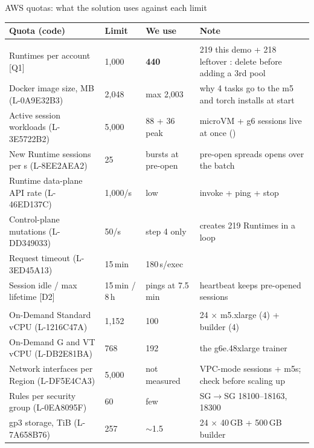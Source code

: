 \begin{frame}{AWS quotas: what the solution uses against each limit}
\tiny\setlength{\tabcolsep}{3pt}
\begin{tabularx}{\textwidth}{@{}P{0.36\textwidth}P{0.12\textwidth}P{0.13\textwidth}Y@{}}
\toprule
\textbf{Quota (code)} & \textbf{Limit} & \textbf{We use} & \textbf{Note}\\
\midrule
{}\\
Runtimes per account [Q1] & 1{,}000 & \textbf{440} & 219 this demo + 218 leftover : delete before adding a 3rd pool\\
Docker image size, MB (L-0A9E32B3) & 2{,}048 & max 2{,}003 & why 4 tasks go to the m5 and torch installs at start\\
Active session workloads (L-3E5722B2) & 5{,}000 & 88 + 36 peak & microVM + g6 sessions live at once ()\\
New Runtime sessions per s (L-8EE2AEA2) & 25 & bursts at pre-open & pre-open spreads opens over the batch\\
Runtime data-plane API rate (L-46ED137C) & 1{,}000/s & low & invoke + ping + stop\\
Control-plane mutations (L-DD349033) & 50/s & step 4 only & creates 219 Runtimes in a loop\\
Request timeout (L-3ED45A13) & 15\,min & 180\,s/exec & \\
Session idle / max lifetime [D2] & 15\,min / 8\,h & pings at 7.5\,min & heartbeat keeps pre-opened sessions\\
\\
On-Demand Standard vCPU (L-1216C47A) & 1{,}152 & 100 & 24 $\times$ m5.xlarge (4) + builder (4)\\
On-Demand G and VT vCPU (L-DB2E81BA) & 768 & 192 & the g6e.48xlarge trainer\\
Network interfaces per Region (L-DF5E4CA3) & 5{,}000 & not measured & VPC-mode sessions + m5s; check before scaling up\\
Rules per security group (L-0EA8095F) & 60 & few & SG$\rightarrow$SG 18100--18163, 18300\\
gp3 storage, TiB (L-7A658B76) & 257 & $\sim$1.5 & 24 $\times$ 40\,GB + 500\,GB builder\\
\bottomrule
\end{tabularx}
\end{frame}


